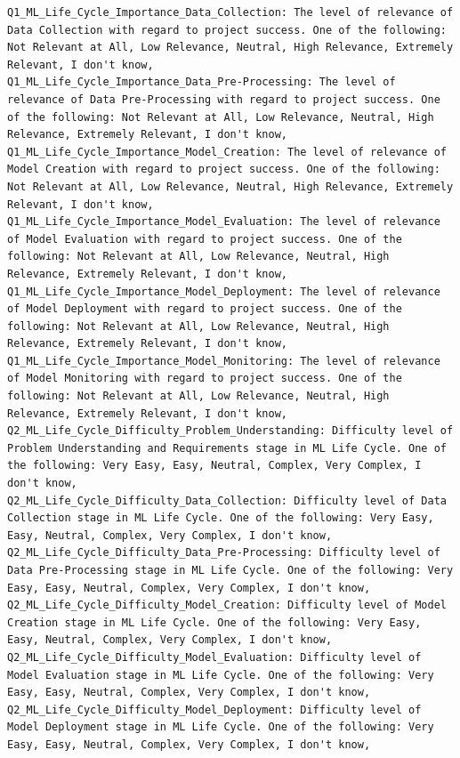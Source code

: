 \begin{verbatim}
Q1_ML_Life_Cycle_Importance_Data_Collection: The level of relevance of Data Collection with regard to project success. One of the following: Not Relevant at All, Low Relevance, Neutral, High Relevance, Extremely Relevant, I don't know,
Q1_ML_Life_Cycle_Importance_Data_Pre-Processing: The level of relevance of Data Pre-Processing with regard to project success. One of the following: Not Relevant at All, Low Relevance, Neutral, High Relevance, Extremely Relevant, I don't know,
Q1_ML_Life_Cycle_Importance_Model_Creation: The level of relevance of Model Creation with regard to project success. One of the following: Not Relevant at All, Low Relevance, Neutral, High Relevance, Extremely Relevant, I don't know,
Q1_ML_Life_Cycle_Importance_Model_Evaluation: The level of relevance of Model Evaluation with regard to project success. One of the following: Not Relevant at All, Low Relevance, Neutral, High Relevance, Extremely Relevant, I don't know,
Q1_ML_Life_Cycle_Importance_Model_Deployment: The level of relevance of Model Deployment with regard to project success. One of the following: Not Relevant at All, Low Relevance, Neutral, High Relevance, Extremely Relevant, I don't know,
Q1_ML_Life_Cycle_Importance_Model_Monitoring: The level of relevance of Model Monitoring with regard to project success. One of the following: Not Relevant at All, Low Relevance, Neutral, High Relevance, Extremely Relevant, I don't know,
Q2_ML_Life_Cycle_Difficulty_Problem_Understanding: Difficulty level of Problem Understanding and Requirements stage in ML Life Cycle. One of the following: Very Easy, Easy, Neutral, Complex, Very Complex, I don't know,
Q2_ML_Life_Cycle_Difficulty_Data_Collection: Difficulty level of Data Collection stage in ML Life Cycle. One of the following: Very Easy, Easy, Neutral, Complex, Very Complex, I don't know,
Q2_ML_Life_Cycle_Difficulty_Data_Pre-Processing: Difficulty level of Data Pre-Processing stage in ML Life Cycle. One of the following: Very Easy, Easy, Neutral, Complex, Very Complex, I don't know,
Q2_ML_Life_Cycle_Difficulty_Model_Creation: Difficulty level of Model Creation stage in ML Life Cycle. One of the following: Very Easy, Easy, Neutral, Complex, Very Complex, I don't know,
Q2_ML_Life_Cycle_Difficulty_Model_Evaluation: Difficulty level of Model Evaluation stage in ML Life Cycle. One of the following: Very Easy, Easy, Neutral, Complex, Very Complex, I don't know,
Q2_ML_Life_Cycle_Difficulty_Model_Deployment: Difficulty level of Model Deployment stage in ML Life Cycle. One of the following: Very Easy, Easy, Neutral, Complex, Very Complex, I don't know,

\end{verbatim}
